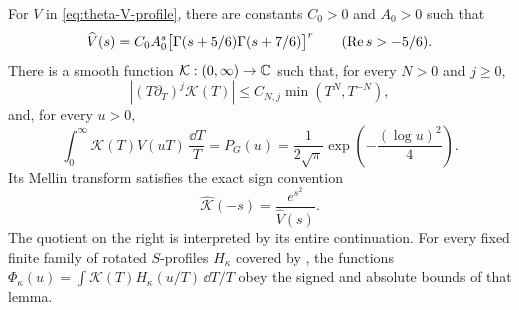 \begin{lemma}\label{lem:gaussian-smoothing}
For \(V\) in \eqref{eq:theta-V-profile}, there are constants
\(C_0>0\) and \(A_0>0\) such that
\begin{equation}\label{eq:theta-V-mellin}
 \widehat V(s)
 =C_0 A_0^s
       \bigl[\Gamma(s+5/6)\Gamma(s+7/6)\bigr]^r
 \qquad(\operatorname{Re} s>-5/6).
\end{equation}
There is a smooth function \(\mathcal K:(0,\infty)\to\mathbb{C}\) such that,
for every \(N>0\) and \(j\ge0\),
\begin{equation}\label{eq:theta-kernel-bounds}
 \left|(T\partial_T)^j\mathcal K(T)\right|
       \le C_{N,j}\min(T^N,T^{-N}),
\end{equation}
and, for every \(u>0\),
\begin{equation}\label{eq:theta-exact-gaussian}
 \int_0^\infty\mathcal K(T)V(uT)\,\frac{\dd T}{T}
  =P_G(u)=\frac{1}{2\sqrt{\pi}}
       \exp\!\left(-\frac{(\log u)^2}{4}\right).
\end{equation}
Its Mellin transform satisfies the exact sign convention
\begin{equation}\label{eq:theta-kernel-mellin}
 \widehat{\mathcal K}(-s)
       =\frac{e^{s^2}}{\widehat V(s)}.
\end{equation}
The quotient on the right is interpreted by its entire continuation.
For every fixed finite family of rotated \(S\)-profiles \(H_\kappa\)
covered by , the functions
\(\Phi_\kappa(u)=\int\mathcal K(T)H_\kappa(u/T)\,\dd T/T\)
obey the signed and absolute bounds of that lemma.
\end{lemma}

